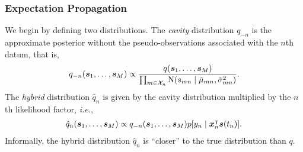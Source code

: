 
\subsubsection{Expectation Propagation}

We begin by defining two distributions.
The \emph{cavity} distribution $q_{-n}$ is the approximate posterior without the pseudo-observations associated with the $n$th datum, that is,
\begin{align*}
	q_{-n}(\bm{s}_1, \ldots, \bm{s}_M) \propto \frac{q(\bm{s}_1, \ldots, \bm{s}_M)}{
	\prod_{m \in \mathcal{X}_n} \mathrm{N}( s_{mn} \mid \tilde{\mu}_{mn}, \tilde{\sigma}^2_{mn} )}.
\end{align*}
The \emph{hybrid} distribution $\hat{q}_n$ is given by the cavity distribution multiplied by the $n$th likelihood factor, \textit{i.e.},
\begin{align*}
	\hat{q}_n(\bm{s}_1, \ldots, \bm{s}_M) \propto q_{-n}(\bm{s}_1, \ldots, \bm{s}_M) p[y_n \mid \bm{x}_n^\intercal \bm{s}(t_n)].
\end{align*}
Informally, the hybrid distribution $\hat{q}_n$ is ``closer'' to the true distribution than $q$.

